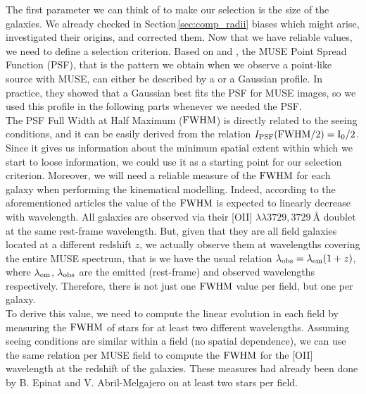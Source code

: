The first parameter we can think of to make our selection is the size of the galaxies. We already checked in Section\,\ref{sec:comp_radii} biases which might arise, investigated their origins, and corrected them. Now that we have reliable values, we need to define a selection criterion. Based on  and , the MUSE Point Spread Function (PSF), that is the pattern we obtain when we observe a point-like source with MUSE, can either be described by   a  or a Gaussian profile. In practice, they showed that a Gaussian best fits the PSF for MUSE images, so we used this profile in the following parts whenever we needed the PSF. \\

The PSF Full Width at Half Maximum ($\rm{FWHM}$) is directly related to the seeing conditions, and it can be easily derived from the relation $I_{\rm{PSF}} ( \rm{FWHM}/2) = I_0 /2$. Since it gives us information about the minimum spatial extent within which we start to loose information, we could use it as a starting point for our selection criterion. Moreover, we will need a reliable measure of the $\rm{FWHM}$ for each galaxy when performing the kinematical modelling. Indeed, according to the aforementioned articles the value of the $\rm{FWHM}$ is expected to linearly decrease with wavelength. All galaxies are observed via their [OII] $\lambda\lambda 3729, \SI{3729}{\angstrom}$ doublet at the same rest-frame wavelength. But, given that they are all field galaxies located at a different redshift $z$, we actually observe them at wavelengths covering the entire MUSE spectrum, that is we have the usual relation $\lambda_{\rm{obs}} = \lambda_{\rm{em}} ( 1 + z )$, where $\lambda_{\rm{em}}$, $\lambda_{\rm{obs}}$ are the emitted (rest-frame) and observed wavelengths respectively. Therefore, there is not just one $\rm{FWHM}$ value per field, but one per galaxy. \\

To derive this value, we need to compute the linear evolution in each field by measuring the $\rm{FWHM}$ of stars for at least two different wavelengths. Assuming seeing conditions are similar within a field (no spatial dependence), we can use the same relation per MUSE field to compute the $\rm{FWHM}$ for the [OII] wavelength at the redshift of the galaxies. These measures had already been done by B. Epinat and V. Abril-Melgajero on at least two stars per field. \\

